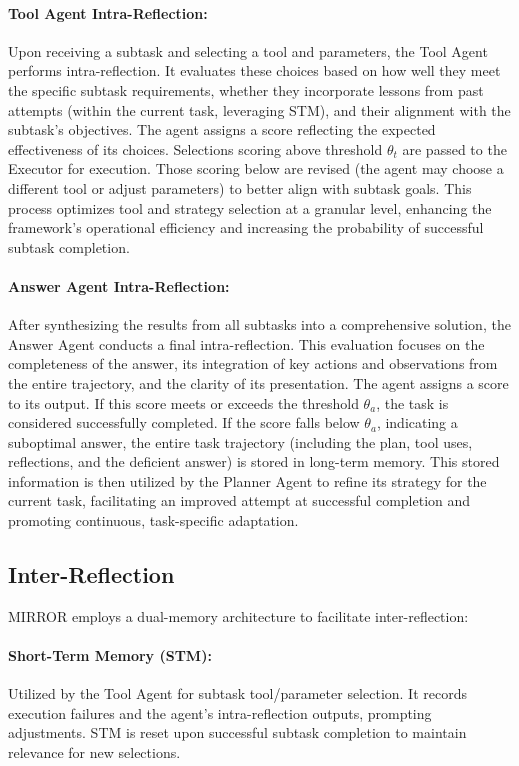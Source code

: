 \documentclass{article}
\begin{document}
\paragraph{Tool Agent Intra-Reflection:} Upon receiving a subtask and selecting a tool and parameters, the Tool Agent performs intra-reflection. It evaluates these choices based on how well they meet the specific subtask requirements, whether they incorporate lessons from past attempts (within the current task, leveraging STM), and their alignment with the subtask's objectives. The agent assigns a score reflecting the expected effectiveness of its choices. Selections scoring above threshold $\theta_t$ are passed to the Executor for execution. Those scoring below are revised (the agent may choose a different tool or adjust parameters) to better align with subtask goals. This process optimizes tool and strategy selection at a granular level, enhancing the framework's operational efficiency and increasing the probability of successful subtask completion.

\paragraph{Answer Agent Intra-Reflection:} After synthesizing the results from all subtasks into a comprehensive solution, the Answer Agent conducts a final intra-reflection. This evaluation focuses on the completeness of the answer, its integration of key actions and observations from the entire trajectory, and the clarity of its presentation. The agent assigns a score to its output. If this score meets or exceeds the threshold $\theta_a$, the task is considered successfully completed. If the score falls below $\theta_a$, indicating a suboptimal answer, the entire task trajectory (including the plan, tool uses, reflections, and the deficient answer) is stored in long-term memory. This stored information is then utilized by the Planner Agent to refine its strategy for the current task, facilitating an improved attempt at successful completion and promoting continuous, task-specific adaptation.


\subsection{Inter-Reflection}
\label{dual-memory}

MIRROR employs a dual-memory architecture to facilitate inter-reflection:

\paragraph{Short-Term Memory (STM):} Utilized by the Tool Agent for subtask tool/parameter selection. It records execution failures and the agent's intra-reflection outputs, prompting adjustments. STM is reset upon successful subtask completion to maintain relevance for new selections.
\end{document}
